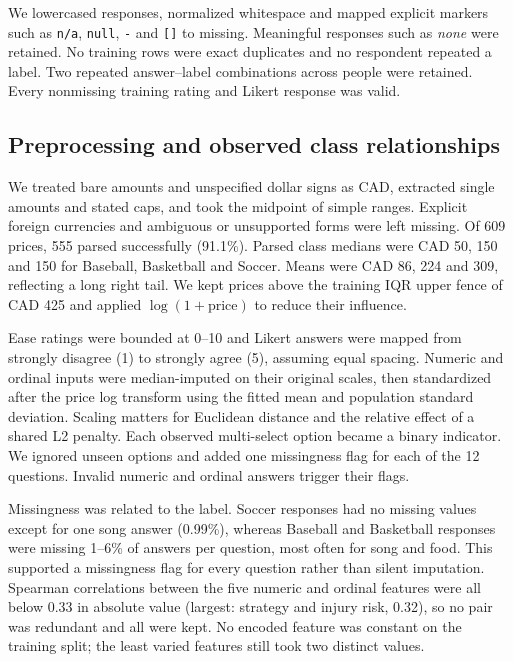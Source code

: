 \documentclass[12pt]{article}
\begin{document}
We lowercased responses, normalized whitespace and mapped explicit markers such
as \texttt{n/a}, \texttt{null}, \texttt{-} and \texttt{[]} to missing.
Meaningful responses such as \emph{none} were retained. No training rows were
exact duplicates and no respondent repeated a label. Two repeated
answer--label combinations across people were retained. Every nonmissing
training rating and Likert response was valid.

\subsection*{Preprocessing and observed class relationships}

We treated bare amounts and unspecified dollar signs as CAD, extracted single
amounts and stated caps, and took the midpoint of simple ranges. Explicit
foreign currencies and ambiguous or unsupported forms were left missing. Of 609
prices, 555 parsed successfully (91.1\%). Parsed class medians were CAD 50, 150
and 150 for Baseball, Basketball and Soccer. Means were CAD 86, 224 and 309,
reflecting a long right tail. We kept prices above the training IQR upper fence
of CAD 425 and applied $\log(1+\text{price})$ to reduce their influence.

Ease ratings were bounded at 0--10 and Likert answers were mapped from strongly
disagree (1) to strongly agree (5), assuming equal spacing. Numeric and ordinal
inputs were median-imputed on their original scales, then standardized after
the price log transform using the fitted mean and population standard
deviation. Scaling matters for Euclidean distance and the relative effect of a
shared L2 penalty. Each observed multi-select option became a binary
indicator. We ignored unseen options and added one missingness flag for each of
the 12 questions. Invalid numeric and ordinal answers trigger their flags.

Missingness was related to the label. Soccer responses had no missing values
except for one song answer (0.99\%), whereas Baseball and Basketball responses
were missing 1--6\% of answers per question, most often for song and food. This
supported a missingness flag for every question rather than silent imputation.
Spearman correlations between the five numeric and ordinal features were all
below 0.33 in absolute value (largest: strategy and injury risk, 0.32), so no
pair was redundant and all were kept. No encoded feature was constant on the
training split; the least varied features still took two distinct values.
\end{document}
